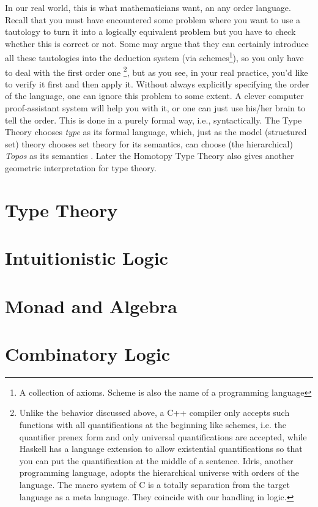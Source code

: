 \documentclass[12pt,a4paper]{report}
\begin{document}
In our real world, this is what mathematicians want, an any order
language. Recall that you must have encountered some problem where
you want to use a tautology to turn it into a logically equivalent
problem but you have to check whether this is correct or not. Some
may argue that they can certainly introduce all these tautologies
into the deduction system (via schemes\footnote{A collection of
axioms. Scheme is also the name of a programming language}), so you 
only have to deal with the first order one \footnote{Unlike the behavior 
discussed above, a C++ compiler only accepts such functions with all 
quantifications at the beginning like schemes, i.e. the quantifier 
prenex form and only universal quantifications are accepted, while 
Haskell has a language extension to allow existential quantifications 
so that you can put the quantification at the middle of a sentence.
Idris, another programming language, adopts the hierarchical universe
with orders of the language. The macro system of C is a totally 
separation from the target language as a meta language. They coincide
with our handling in logic.}, but as you see, in your real practice, 
you'd like to verify it first and then apply it. Without always 
explicitly specifying the order of the language, one can ignore this 
problem to some extent. A clever computer proof-assistant system will 
help you with it, or one can just use his/her brain to tell the order. 
This is done in a purely formal way, i.e., syntactically. The 
Type Theory \cite{intuitionistic-type-theory} chooses {\it type}
as its formal language, which, just as the model (structured set)
theory chooses set theory for its semantics, can choose 
(the hierarchical) {\it Topos} as its semantics 
\cite{Introduction-to-higher-order-categorical-logic,
categorical-logic-and-type-theory}. Later the Homotopy Type Theory
\cite{homotopy-type-theory,univalence} also gives another 
geometric interpretation for type theory. 

\chapter{Type Theory}
\label{type-theory}
\chapter{Intuitionistic Logic}
\chapter{Monad and Algebra}
\chapter{Combinatory Logic}
\end{document}
